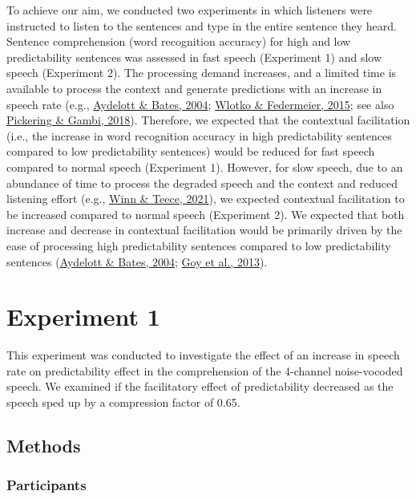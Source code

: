 \documentclass[a4paper, nobind]{templates/ociamthesis}
\begin{document}
To achieve our aim, we conducted two experiments in which listeners were instructed to listen to the sentences and type in the entire sentence they heard.
Sentence comprehension (word recognition accuracy) for high and low predictability sentences was assessed in fast speech (Experiment 1) and slow speech (Experiment 2).
The processing demand increases, and a limited time is available to process the context and generate predictions with an increase in speech rate (e.g., \protect\hyperlink{ref-Aydelott2004}{Aydelott \& Bates, 2004}; \protect\hyperlink{ref-Wlotko2015}{Wlotko \& Federmeier, 2015}; see also \protect\hyperlink{ref-Pickering2018}{Pickering \& Gambi, 2018}).
Therefore, we expected that the contextual facilitation (i.e., the increase in word recognition accuracy in high predictability sentences compared to low predictability sentences) would be reduced for fast speech compared to normal speech (Experiment 1).
However, for slow speech, due to an abundance of time to process the degraded speech and the context and reduced listening effort (e.g., \protect\hyperlink{ref-Winn2021}{Winn \& Teece, 2021}), we expected contextual facilitation to be increased compared to normal speech (Experiment 2).
We expected that both increase and decrease in contextual facilitation would be primarily driven by the ease of processing high predictability sentences compared to low predictability sentences (\protect\hyperlink{ref-Aydelott2004}{Aydelott \& Bates, 2004}; \protect\hyperlink{ref-Goy2013}{Goy et al., 2013}).

\hypertarget{experiment-1}{%
\section{Experiment 1}\label{experiment-1}}

This experiment was conducted to investigate the effect of an increase in speech rate on predictability effect in the comprehension of the 4-channel noise-vocoded speech.
We examined if the facilitatory effect of predictability decreased as the speech sped up by a compression factor of 0.65.

\hypertarget{methods-3}{%
\subsection{Methods}\label{methods-3}}

\hypertarget{participants-2}{%
\subsubsection{Participants}\label{participants-2}}
\end{document}
